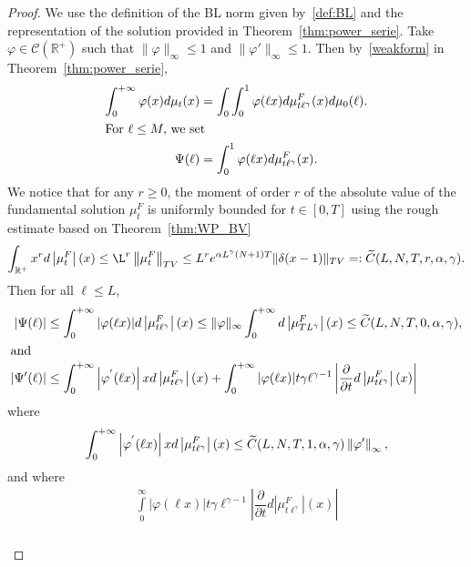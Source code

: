 \documentclass[10pt]{amsart}
\theoremstyle{definition}\newtheorem{defi}[theo]{Definition}\newtheorem{rema}[theo]{Remark}\newtheorem{exam}[theo]{Example}\newtheorem{exem}[theo]{Example}\newtheorem{nota}[theo]{Notation}
\newcommand*\dst{\displaystyle}
\newcommand*\p{\partial}
\newcommand*\R{\mathbb{R}}
\newcommand{\clC}{\mathcal{C}}
\let\oldtilde\tilde
\renewcommand*{\tilde}[1]{\mathchoice{\widetilde{#1}}{\widetilde{#1}}{\oldtilde{#1}}{\oldtilde{#1}}}
\begin{document}
\begin{proof}
We use the definition of the BL norm given by~\eqref{def:BL} and the representation of the solution provided in Theorem~\ref{thm:power_serie}. Take $\varphi \in \clC(\R^+)$ such that $\|\varphi\|_{\infty}\leq 1$ and $\|\varphi'\|_{\infty}\leq 1$. Then by~\eqref{weakform} in Theorem~\ref{thm:power_serie},
\begin{align*}
\dst\int_0^{+\infty} \varphi(x)d\mu_t(x) &= \dst\int_0 \dst\int_0^{1} \varphi(\ell x) d\mu_{t \ell^{\gamma}}^{F}(x) d\mu_0(\ell).
\\
\intertext{For $\ell \leq M,$ we set}
\Psi(\ell) &= \dst\int_0^{1} \varphi(\ell x) d\mu_{t \ell^{\gamma}}^{F}(x).
\end{align*}
We notice that for any $r\geq0$, the moment of order $r$ of the absolute value of the fundamental solution $\mu_t^F$ is uniformly bounded for $t\in[0,T]$ using the rough estimate based on Theorem~\ref{thm:WP_BV}
\begin{equation*}
\dst\int_{\R^+} x^rd\left|\mu_t^F\right|(x) \leq \L^r \left\|\mu_t^F\right\|_{TV} \leq
L^r e^{\alpha L^{\gamma} (N+1)T}\|\delta(x-1)\|_{TV} =:\tilde{C}(L,N,T,r,\alpha,\gamma).
\end{equation*}
Then for all $\ell \leq L$,
\begin{align*}
\left|\Psi(\ell)\right| &\leq \dst\int_0^{+\infty} |\varphi(\ell x)| d\left|\mu_{t \ell^{\gamma}}^{F}\right|(x) \leq \|\varphi\|_{\infty} \dst\int_0^{+\infty} d \left|\mu_{T L^{\gamma}}^{F}\right|(x) \leq \tilde{C}(L,N,T,0,\alpha,\gamma),
\\
\intertext{and}
\left|\Psi'(\ell)\right| &\leq \dst\int_0^{+\infty}\left|\varphi^{'}(\ell x)\right|x d \left|\mu_{t \ell^{\gamma}}^{F}\right|(x) + \dst\int_0^{+\infty} |\varphi(\ell x)| t \gamma \ell^{\gamma-1} \left|\dfrac{\p}{\p t} d \left|\mu_{t \ell^{\gamma}}^{F}\right|(x) \right|\\
\end{align*}
where
\begin{equation*}
\dst\int_0^{+\infty} \left|\varphi^{{'}}(\ell x)\right|x d\left|\mu_{t \ell^{\gamma}}^{F}\right|(x) \leq \tilde{C}(L,N,T,1,\alpha,\gamma)\left\|\varphi'\right\|_{\infty},
\end{equation*}
and where
\begin{multline*}
\int\limits_0^{\infty} |\varphi(\ell x)| t \gamma \ell^{\gamma-1} \left|\dfrac{\p}{\p t} d \left|\mu_{t \ell^{\gamma}}^{F}\right|(x) \right| \\
\begin{aligned}

\end{aligned}
\end{multline*}
\end{proof}
\end{document}
